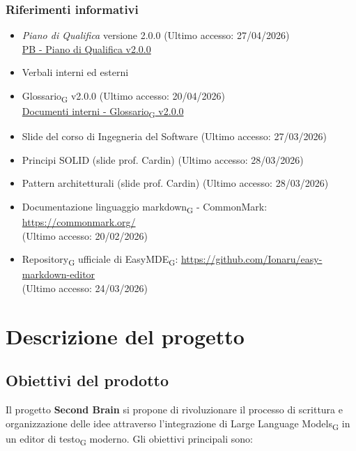 \documentclass[11pt,a4paper]{article}
\newcommand{\gls}[1]{#1\textsubscript{G}}
\begin{document}
\subsubsection{Riferimenti informativi}
\begin{itemize}
    \item \textit{Piano di Qualifica} versione 2.0.0 (Ultimo accesso: 27/04/2026) \\
    \href{https://byteme25.github.io/ByteMe/}{PB - Piano di Qualifica v2.0.0}
    \item Verbali interni ed esterni
    \item \gls{Glossario} v2.0.0 (Ultimo accesso: 20/04/2026)\\
    \href{https://byteme25.github.io/ByteMe/files.html}{Documenti interni - \gls{Glossario} v2.0.0}
    
    \item Slide del corso di Ingegneria del Software (Ultimo accesso: 27/03/2026)
    \item Principi SOLID (slide prof. Cardin) (Ultimo accesso: 28/03/2026)
    \item Pattern architetturali (slide prof. Cardin) (Ultimo accesso: 28/03/2026)

    \item Documentazione linguaggio \gls{markdown} - CommonMark: \url{https://commonmark.org/}\\ (Ultimo accesso: 20/02/2026)
    \item \gls{Repository} ufficiale di \gls{EasyMDE}: \url{https://github.com/Ionaru/easy-markdown-editor}\\ (Ultimo accesso: 24/03/2026)
\end{itemize}

\newpage

\section{Descrizione del progetto}
\subsection{Obiettivi del prodotto}
Il progetto \textbf{Second Brain} si propone di rivoluzionare il processo di scrittura e organizzazione delle idee attraverso l'integrazione di Large Language Models\textsubscript{G} in un \gls{editor di testo} moderno. Gli obiettivi principali sono:
\end{document}
